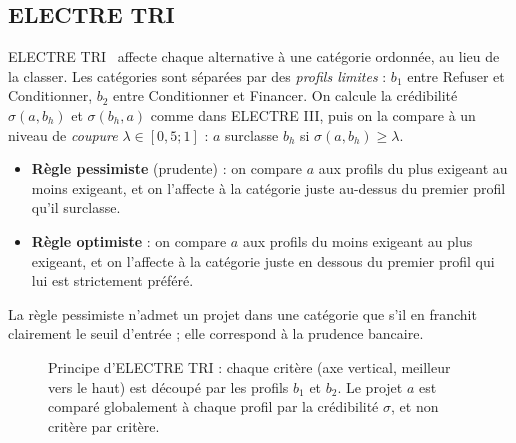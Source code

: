\subsection{ELECTRE TRI}

ELECTRE TRI~\cite{yu1992} affecte chaque alternative à une catégorie ordonnée, au lieu de la classer. Les catégories
sont séparées par des \emph{profils limites} : $b_1$ entre Refuser et Conditionner, $b_2$ entre Conditionner et
Financer. On calcule la crédibilité $\sigma(a, b_h)$ et $\sigma(b_h, a)$ comme dans ELECTRE III, puis on la
compare à un niveau de \emph{coupure} $\lambda \in [0{,}5 ; 1]$ : $a$ surclasse $b_h$ si $\sigma(a,b_h) \geq \lambda$.

\begin{itemize}
  \item \textbf{Règle pessimiste} (prudente) : on compare $a$ aux profils du plus exigeant au moins exigeant, et on
        l'affecte à la catégorie juste au-dessus du premier profil qu'il surclasse.
  \item \textbf{Règle optimiste} : on compare $a$ aux profils du moins exigeant au plus exigeant, et on l'affecte à la
        catégorie juste en dessous du premier profil qui lui est strictement préféré.
\end{itemize}
La règle pessimiste n'admet un projet dans une catégorie que s'il en franchit clairement le seuil d'entrée ; elle
correspond à la prudence bancaire.

\begin{figure}[htbp]
\centering
{}
\caption{Principe d'ELECTRE TRI : chaque critère (axe vertical, \og meilleur \fg{} vers le haut) est découpé par les
profils $b_1$ et $b_2$. Le projet $a$ est comparé globalement à chaque profil par la crédibilité $\sigma$, et non
critère par critère.}
\label{fig:electretri}
\end{figure}

